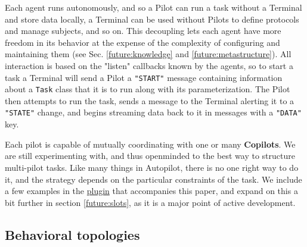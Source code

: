 Each agent runs autonomously, and so a Pilot can run a task without a Terminal and store data locally, a Terminal can be used without Pilots to define protocols and manage subjects, and so on. This decoupling lets each agent have more freedom in its behavior at the expense of the complexity of configuring and maintaining them (see Sec. \ref{future:knowledge} and \ref{future:metastructure}). All interaction is based on the "listen" callbacks known by the agents, so to start a task a Terminal will send a Pilot a \texttt{"START"} message containing information about a \texttt{Task} class that it is to run along with its parameterization. The Pilot then attempts to run the task, sends a message to the Terminal alerting it to a \texttt{"STATE"} change, and begins streaming data back to it in messages with a \texttt{"DATA"} key.

Each pilot is capable of mutually coordinating with one or many \textbf{Copilots}. We are still experimenting with, and thus openminded to the best way to structure multi-pilot tasks. Like many things in Autopilot, there is no one right way to do it, and the strategy depends on the particular constraints of the task. We include a few examples in the \href{https://wiki.auto-pi-lot.com/index.php/Plugin:Autopilot\_Paper}{plugin} that accompanies this paper, and expand on this a bit further in section \ref{future:slots}, as it is a major point of active development.


\subsection{Behavioral topologies}
\label{sec:topology}

